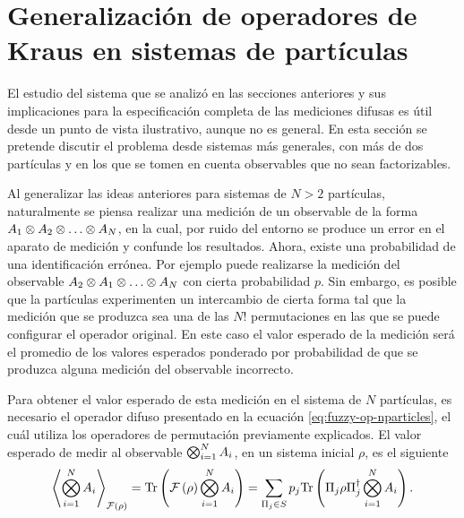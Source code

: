 \section{Generalización de operadores de Kraus en sistemas de \texorpdfstring{}{N} partículas}\label{sec:cap3 generalizacion-} %

El estudio del sistema que se analizó en las secciones anteriores y sus
implicaciones para la especificación completa de las mediciones difusas es útil
desde un punto de vista ilustrativo, aunque no es general. En esta sección se
pretende discutir el problema desde sistemas más generales, con más de dos
partículas y en los que se tomen en cuenta observables que no sean
factorizables.



Al generalizar las ideas anteriores para sistemas de $N>2$ partículas,
naturalmente se piensa realizar una medición de un observable de la forma
$A_1\otimes A_2\otimes \hdots \otimes A_N$, en la cual, por ruido del entorno
se produce un  error en el aparato de medición y confunde los resultados.
Ahora, existe una probabilidad de una identificación errónea.  Por ejemplo
puede realizarse la medición del observable $A_2\otimes A_1\otimes \hdots
\otimes A_N$ con cierta probabilidad $p$. Sin embargo, es posible que la
partículas experimenten un intercambio de cierta forma tal que la medición que
se produzca sea una de las $N{!}$ permutaciones en las que se puede configurar
el operador original. En este caso el valor esperado de la medición será el
promedio de los valores esperados  ponderado por probabilidad de que se
produzca alguna medición del observable incorrecto. 

Para obtener el valor esperado de esta medición en el sistema de $N$
partículas, es necesario el operador difuso presentado en la ecuación
{\eqref{eq:fuzzy-op-nparticles}}, el cuál utiliza los operadores de permutación
previamente explicados. El valor esperado de medir al observable $\bigotimes_{i=1}^{N}
A_i$, en un sistema inicial $\rho$,  es el siguiente
\begin{equation*}\label{eq:ExpectedValue-generalForm}\begin{split}
    \left \langle \bigotimes_{i=1}^{N} A_i\right \rangle_{\mathcal{F}(\rho)} &={\rm Tr}\left(\mathcal{F}\left(\rho\right)\bigotimes_{i=1}^{N} A_i\right)=\sum_{\Pi_j \in S}p_{j}{\rm Tr} \left(\Pi_{j}\rho\Pi_{j}^{\dagger} \bigotimes_{i=1}^{N} A_i\right).\\
\end{split}
\end{equation*}  

